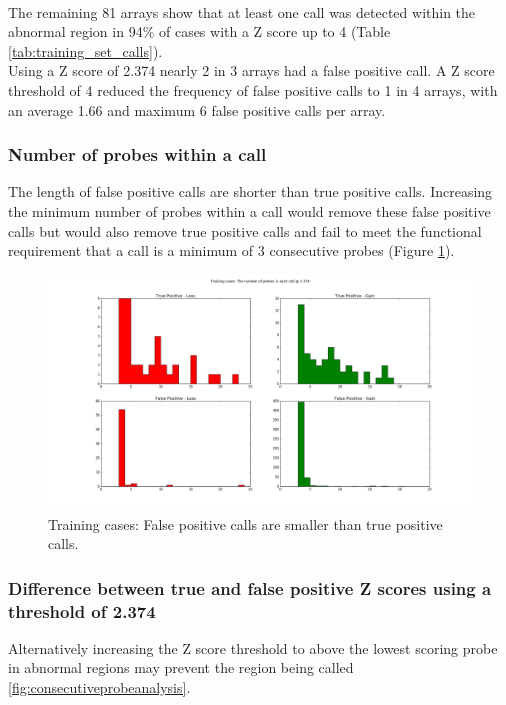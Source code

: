 \paragraph*{}
The remaining 81 arrays show that at least one call was detected within the abnormal region in 94\% of cases with a Z score up to 4 (Table \ref{tab:training_set_calls}).
\\
Using a Z score of 2.374 nearly 2 in 3 arrays had a false positive call. A Z score threshold of 4 reduced the frequency of false positive calls to 1 in 4 arrays, with an average 1.66 and maximum 6 false positive calls per array.

\subsubsection{Number of probes within a call}
The length of false positive calls are shorter than true positive calls. Increasing the minimum number of probes within a call would remove these false positive calls but would also remove true positive calls and fail to meet the functional requirement that a call is a minimum of 3 consecutive probes (Figure \ref{fig:nprobes_2_374}).

\begin{figure}[h]
\centering
\includegraphics[width=\linewidth]{./Figures/nprobes_2_374}
\caption{Training cases: False positive calls are smaller than true positive calls.}
\label{fig:nprobes_2_374}
\end{figure}

\subsubsection{Difference between true and false positive Z scores using a threshold of 2.374}
Alternatively increasing the Z score threshold to above the lowest scoring probe in abnormal regions may prevent the region being called \ref{fig:consecutiveprobeanalysis}.
